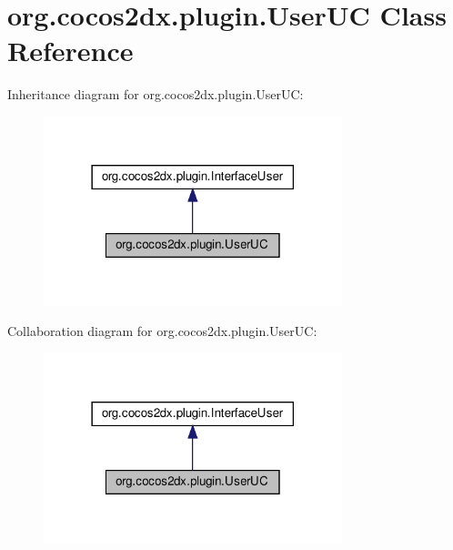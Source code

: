 \hypertarget{classorg_1_1cocos2dx_1_1plugin_1_1UserUC}{}\section{org.\+cocos2dx.\+plugin.\+User\+UC Class Reference}
\label{classorg_1_1cocos2dx_1_1plugin_1_1UserUC}


Inheritance diagram for org.\+cocos2dx.\+plugin.\+User\+UC\+:
\nopagebreak
\begin{figure}[H]
\begin{center}
\leavevmode
\includegraphics[width=246pt]{classorg_1_1cocos2dx_1_1plugin_1_1UserUC__inherit__graph}
\end{center}
\end{figure}


Collaboration diagram for org.\+cocos2dx.\+plugin.\+User\+UC\+:
\nopagebreak
\begin{figure}[H]
\begin{center}
\leavevmode
\includegraphics[width=246pt]{classorg_1_1cocos2dx_1_1plugin_1_1UserUC__coll__graph}
\end{center}
\end{figure}
